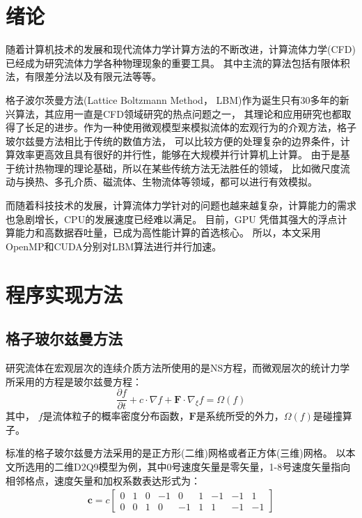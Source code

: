 \documentclass[UTF8]{ctexart}
\begin{document}
    
    
    
    \newpage
    
    \tableofcontents
    \setcounter{page}{0}

    \newpage
    \section{绪论}
        随着计算机技术的发展和现代流体力学计算方法的不断改进，计算流体力学(CFD)已经成为研究流体力学各种物理现象的重要工具。
        其中主流的算法包括有限体积法，有限差分法以及有限元法等等。

        格子波尔茨曼方法(Lattice Boltzmann Method， LBM)作为诞生只有30多年的新兴算法，其应用一直是CFD领域研究的热点问题之一，
        其理论和应用研究也都取得了长足的进步。作为一种使用微观模型来模拟流体的宏观行为的介观方法，格子玻尔兹曼方法相比于传统的数值方法，
        可以比较方便的处理复杂的边界条件，计算效率更高效且具有很好的并行性，能够在大规模并行计算机上计算。
        由于是基于统计热物理的理论基础，所以在某些传统方法无法胜任的领域，
        比如微尺度流动与换热、多孔介质、磁流体、生物流体等领域，都可以进行有效模拟。

        而随着科技技术的发展，计算流体力学针对的问题也越来越复杂，计算能力的需求也急剧增长，CPU的发展速度已经难以满足。
        目前，GPU 凭借其强大的浮点计算能力和高数据吞吐量，已成为高性能计算的首选核心。
        所以，本文采用OpenMP和CUDA分别对LBM算法进行并行加速。

        
    \section{程序实现方法}
    \subsection{格子玻尔兹曼方法}
        研究流体在宏观层次的连续介质方法所使用的是NS方程，而微观层次的统计力学所采用的方程是玻尔兹曼方程：
        \begin{equation}
            \frac{\partial f}{\partial t}+c\cdot \nabla f+\boldsymbol{F}\cdot {{\nabla }_{\xi }}f=\Omega \left( f \right)
        \end{equation}
        其中， $f$是流体粒子的概率密度分布函数，$\boldsymbol{F}$是系统所受的外力，$\Omega \left( f \right)$是碰撞算子。
       
        标准的格子玻尔兹曼方法采用的是正方形(二维)网格或者正方体(三维)网格。
        以本文所选用的二维D2Q9模型为例，其中0号速度矢量是零矢量，1-8号速度矢量指向相邻格点，速度矢量和加权系数表达形式为：
        \begin{equation}
        \begin{aligned}
            \boldsymbol{c}=c\begin{bmatrix}
                0& 1& 0& -1& 0 & 1& -1& -1& 1\\
                0& 0& 1& 0 & -1& 1& 1& -1& -1
            \end{bmatrix}
        \end{aligned}
        \end{equation}
        
\end{document}
